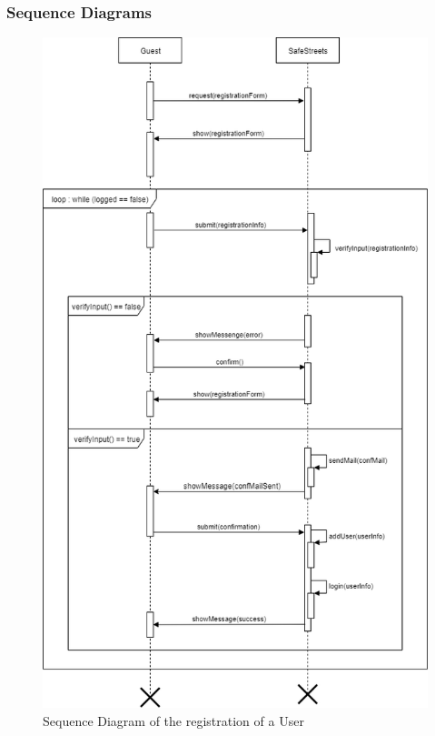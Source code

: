     \subsubsection{Sequence Diagrams}
    
    \begin{figure}[h]
        \centering
        \includegraphics[scale=0.5]{Images/SeqDiag_registration.png}
        \caption{Sequence Diagram of the registration of a User}
    \end{figure}
    
